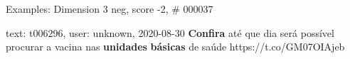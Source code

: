 \begin{frame}{Examples: Dimension 3 neg, score -2, \# 000037}
\footnotesize
\begin{alertblock}{text: t006296, user: unknown, 2020-08-30}
 \textbf{Confira} até que dia será possível procurar a vacina 
nas \textbf{unidades} \textbf{básicas} de saúde 
 https://t.co/GM07OIAjeb 
\end{alertblock}
\end{frame}
